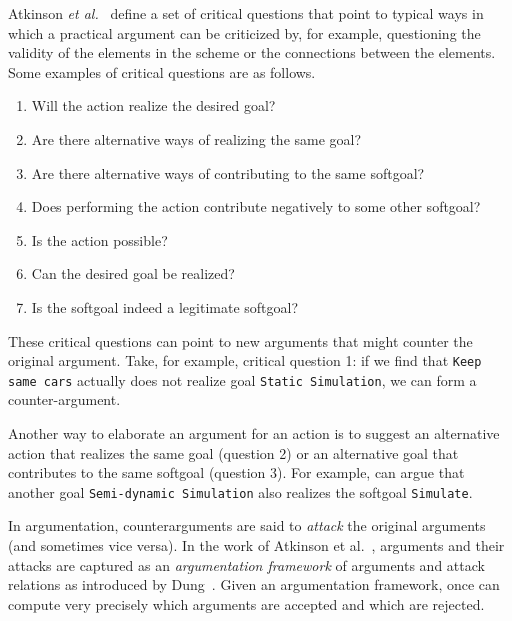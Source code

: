 Atkinson \emph{et al.}~\cite{atkinson2007} define a set of critical questions that point to typical ways in which a practical argument can be criticized by, for example, questioning the validity of the elements in the scheme or the connections between the elements. Some examples of critical questions are as follows.

\begin{enumerate}
\item Will the action realize the desired goal?
\item Are there alternative ways of realizing the same goal?
\item Are there alternative ways of contributing to the same softgoal?
\item Does performing the action contribute negatively to some other softgoal?
\item Is the action possible?
\item Can the desired goal be realized?
\item Is the softgoal indeed a legitimate softgoal?
\end{enumerate}

These critical questions can point to new arguments that might counter the original argument. Take, for example, critical question 1: if we find that  \texttt{Keep same cars} actually does not realize goal \texttt{Static Simulation}, we can form a counter-argument. %

Another way to elaborate an argument for an action is to suggest an alternative action that realizes the same goal (question 2) or an alternative goal that contributes to the same softgoal (question 3). For example,  can argue that another goal \texttt{Semi-dynamic Simulation} also realizes the softgoal \texttt{Simulate}.

In argumentation, counterarguments are said to \emph{attack} the original arguments (and sometimes vice versa). In the work of Atkinson et al.~\cite{atkinson2007}, arguments and their attacks are captured as an \emph{argumentation framework} of arguments and attack relations as introduced by Dung~\cite{Dung1995}. Given an argumentation framework, once can compute very precisely which arguments are accepted and which are rejected. 

